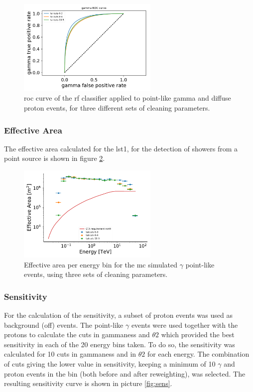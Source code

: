 \documentclass[main.tex]{subfiles}
\begin{document}
\begin{figure}
\centering
 \includegraphics[width=0.6\textwidth]{Pictures/ROC.pdf}
  \caption{\gls{roc} curve of the \gls{rf} classifier applied to point-like gamma and diffuse proton events, for three different sets of cleaning parameters.}
    \label{fig:roc}
\end{figure}

\subsubsection{Effective Area}

The effective area calculated for the \gls{lst}1, for the detection of showers from a point source is shown in figure \ref{fig:effarea}.  


\begin{figure}
\centering
 \includegraphics[width=0.6\textwidth]{Pictures/effective_area.pdf}
  \caption{Effective area per energy bin for the \gls{mc} simulated $\gamma$ point-like events, using three sets of cleaning parameters.}
    \label{fig:effarea}
\end{figure}

\subsubsection{Sensitivity}

For the calculation of the sensitivity, a subset of proton events was used as background (off) events. The point-like $\gamma$ events were used together with the protons to calculate the cuts in gammaness and $\theta2$ which provided the best sensitivity in each of the 20 energy bins taken. To do so, the sensitivity was calculated for 10 cuts in gammaness and in $\theta2$ for each energy. The combination of cuts giving the lower value in sensitivity, keeping a minimum of 10 $\gamma$ and proton events in the bin (both before and after reweighting), was selected. The resulting sensitivity curve is shown in picture \ref{fig:sens}.   
\end{document}
